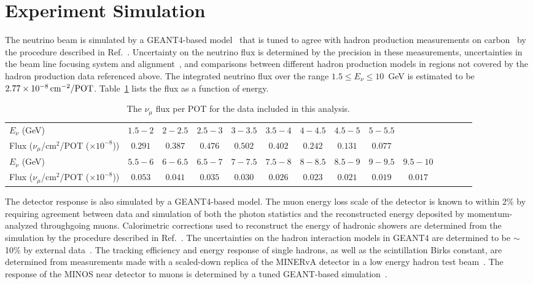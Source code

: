 \section{Experiment Simulation}
\label{sec:expt_sim}
The neutrino beam is simulated by a GEANT4-based model~\cite{Agostinelli2003250,1610988} that is tuned to agree with 
hadron production measurements on carbon~\cite{Alt:2006fr, Lebedev:2007zz} by the procedure described in Ref.~\cite{MINERVAnubarprl}.  Uncertainty on
the neutrino flux is determined by the precision in these measurements, uncertainties in the beam line
focusing system and alignment~\cite{Pavlovic:2008zz}, and comparisons between different hadron production models in regions not
covered by the hadron production data referenced above.  The integrated neutrino flux over the range 
$1.5\le E_\nu \le 10$~GeV is estimated to be $\unit[2.77 \times 10^{-8}]{cm^{-2}/POT}$.  Table~\ref{tab:nu_flux} lists the flux as a function of energy.

\begingroup
\squeezetable
\begin{table}[t]
\centering
\begin{tabular}{l|ccccccccccccc}
\hline \hline
$E_\nu$ (GeV) & 
$1.5 - 2$ &
$2 - 2.5$ &
$2.5 - 3$ &
$3 - 3.5$ &
$3.5 - 4$ &
$4 - 4.5$ &
$4.5 - 5$ &
$5 - 5.5$ \\
Flux ($\nu_{\mu}$/cm$^2$/POT ($\times 10^{-8}$)) &
$0.291	$ &
$0.387	$&
$0.476	$&
$0.502   $&
$0.402	$&
$0.242	$&
$0.131	$&
$0.077	$ \\
\hline
$E_\nu$ (GeV) & 
$5.5 - 6$ &
$6 - 6.5$ &
$6.5 - 7$ &
$7 - 7.5$ &
$7.5 - 8$ &
$8 - 8.5$ &
$8.5 - 9$ &
$9 - 9.5$ &
$9.5 - 10$ \\
Flux ($\nu_{\mu}$/cm$^2$/POT ($\times 10^{-8}$)) &
$0.053   $&
$0.041	$&
$0.035	$&
$0.030	$&
$0.026	$&
$0.023	$&
$0.021	$&
$0.019	$&
$0.017	$ \\ \hline \hline
\end{tabular}
\caption{The $\nu_\mu$ flux per POT for the data included in this analysis.}
\label{tab:nu_flux}
\end{table}
\endgroup

The \minerva detector response is also simulated by a GEANT4-based model.  The muon energy loss scale of the detector
is known to within 2\% by requiring agreement between data and simulation of both the photon statistics and the reconstructed
energy deposited by momentum-analyzed throughgoing muons. Calorimetric corrections used to reconstruct the
energy of hadronic showers are determined from the simulation by the procedure described in Ref.~\cite{minerva_nim}.  The 
uncertainties on the hadron interaction models in GEANT4 are determined to be $\sim$10\% by external 
data~\cite{Ashery:1981tq,Allardyce:1973ce,Saunders:1996ic,Lee:2002eq}.  The tracking efficiency and 
energy response of single hadrons, as well as the scintillation Birks constant, are determined from measurements made 
with a scaled-down replica of the MINERvA detector 
in a low energy hadron test beam~\cite{mnv_testbeam}. The response of the MINOS near detector to muons is determined by a tuned
GEANT-based
simulation~\cite{Michael:2008bc}.

